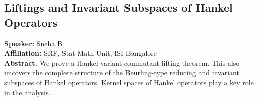 \subsection*{Liftings and Invariant Subspaces of Hankel Operators} 
\noindent
\textbf{Speaker:} Sneha B \\ %
\textbf{Affiliation:} SRF, Stat-Math Unit, ISI Bangalore\\ %

\noindent\textbf{Abstract.} We prove a Hankel-variant commutant lifting theorem. This also uncovers the complete structure of the Beurling-type reducing and invariant subspaces of Hankel operators. Kernel spaces of Hankel operators play a key role in the analysis.

